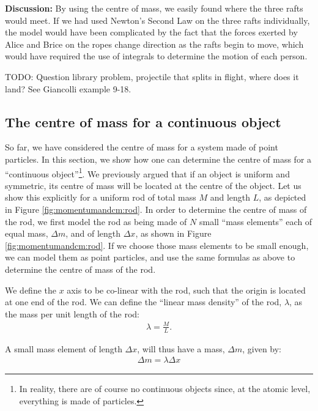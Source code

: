 \begin{example}
\textbf{Discussion: }By using the centre of mass, we easily found where the three rafts would meet. If we had used Newton's Second Law on the three rafts individually, the model would have been complicated by the fact that the forces exerted by Alice and Brice on the ropes change direction as the rafts begin to move, which would have required the use of integrals to determine the motion of each person.
\end{example}
TODO: Question library problem, projectile that splits in flight, where does it land? See Giancolli example 9-18.

\subsection{The centre of mass for a continuous object}
So far, we have considered the centre of mass for a system made of point particles. In this section, we show how one can determine the centre of mass for a ``continuous object''\footnote{In reality, there are of course no continuous objects since, at the atomic level, everything is made of particles.}. We previously argued that if an object is uniform and symmetric, its centre of mass will be located at the centre of the object. Let us show this explicitly for a uniform rod of total mass $M$ and length $L$, as depicted in Figure \ref{fig:momentumandcm:rod}.
In order to determine the centre of mass of the rod, we first model the rod as being made of $N$ small ``mass elements'' each of equal mass, $\Delta m$, and of length $\Delta x$, as shown in Figure \ref{fig:momentumandcm:rod}. If we choose those mass elements to be small enough, we can model them as point particles, and use the same formulas as above to determine the centre of mass of the rod.

We define the $x$ axis to be co-linear with the rod, such that the origin is located at one end of the rod. We can define the ``linear mass density'' of the rod, $\lambda$, as the mass per unit length of the rod:
\begin{align*}
\lambda = \frac{M}{L}.
\end{align*}

A small mass element of length $\Delta x$, will thus have a mass, $\Delta m$, given by:
\begin{align*}
\Delta m = \lambda \Delta x 
\end{align*}

